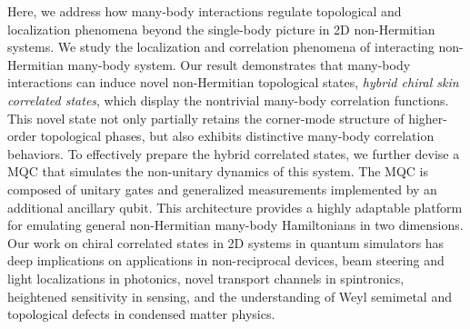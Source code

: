 \documentclass[longbibliography, aps, prx, amsmath, amssymb, amsfonts, twocolumn,superscriptaddress, footinbib]{revtex4-1}
\begin{document}
	Here, we address how many-body interactions regulate topological and localization phenomena beyond the single-body picture in 2D non-Hermitian systems. We study the localization and correlation phenomena of interacting non-Hermitian many-body system. 
	Our result demonstrates that many-body interactions can induce novel non-Hermitian topological states, \textit{hybrid chiral skin correlated states}, which display the nontrivial many-body correlation functions. 
	This novel state not only partially retains the corner-mode structure of higher-order topological phases, but also exhibits distinctive many-body correlation behaviors.
	To effectively prepare the hybrid correlated states, we further devise a MQC that simulates the non-unitary dynamics of this system. 
	The MQC is composed of unitary gates and generalized measurements implemented by an additional ancillary qubit. This architecture provides a highly adaptable platform for emulating general non-Hermitian many-body Hamiltonians in two dimensions.
	Our work on chiral correlated states in 2D systems in quantum simulators has deep implications on applications in non-reciprocal devices, beam steering and light localizations in photonics, novel transport channels in spintronics, heightened sensitivity in sensing, and the understanding of Weyl semimetal and topological defects in condensed matter physics.
    
\end{document}
